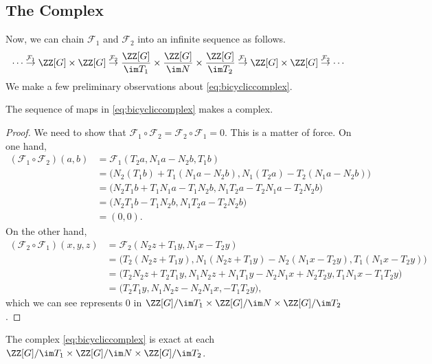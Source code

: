 \documentclass{article}
\begin{document}
\subsection{The Complex}
Now, we can chain $\mathcal F_1$ and $\mathcal F_2$ into an infinite sequence as follows.
\begin{equation}
	\cdots\stackrel{\mathcal F_1}\to\ZZ[G]\times\ZZ[G]\stackrel{\mathcal F_2}\to\frac{\ZZ[G]}{\im T_1}\times\frac{\ZZ[G]}{\im N}\times\frac{\ZZ[G]}{\im T_2}\stackrel{\mathcal F_1}\to\ZZ[G]\times\ZZ[G]\stackrel{\mathcal F_2}\to\cdots \label{eq:bicycliccomplex}
\end{equation}
We make a few preliminary observations about \autoref{eq:bicycliccomplex}.
\begin{lemma} \label{lem:getcomplex}
	The sequence of maps in \autoref{eq:bicycliccomplex} makes a complex.
\end{lemma}
\begin{proof}
	We need to show that $\mathcal F_1\circ\mathcal F_2=\mathcal F_2\circ\mathcal F_1=0$. This is a matter of force. On one hand,
	\begin{align*}
		(\mathcal F_1\circ\mathcal F_2)(a,b) &= \mathcal F_1(T_2a,N_1a-N_2b,T_1b) \\
		&= \big(N_2(T_1b)+T_1(N_1a-N_2b),N_1(T_2a)-T_2(N_1a-N_2b)\big) \\
		&= \big(N_2T_1b+T_1N_1a-T_1N_2b,N_1T_2a-T_2N_1a-T_2N_2b\big) \\
		&= \big(N_2T_1b-T_1N_2b,N_1T_2a-T_2N_2b\big) \\
		&= (0,0).
	\end{align*}
	On the other hand,
	\begin{align*}
		(\mathcal F_2\circ\mathcal F_1)(x,y,z) &= \mathcal F_2(N_2z+T_1y,N_1x-T_2y) \\
		&= \big(T_2(N_2z+T_1y),N_1(N_2z+T_1y)-N_2(N_1x-T_2y),T_1(N_1x-T_2y)\big) \\
		&= \big(T_2N_2z+T_2T_1y,N_1N_2z+N_1T_1y-N_2N_1x+N_2T_2y,T_1N_1x-T_1T_2y\big) \\
		&= \big(T_2T_1y,N_1N_2z-N_2N_1x,-T_1T_2y\big),
	\end{align*}
	which we can see represents $0$ in $\ZZ[G]/\im T_1\times\ZZ[G]/\im N\times\ZZ[G]/\im T_2$.
\end{proof}
\begin{lemma} \label{lem:almostexact}
	The complex \autoref{eq:bicycliccomplex} is exact at each $\ZZ[G]/\im T_1\times\ZZ[G]/\im N\times\ZZ[G]/\im T_2$.
\end{lemma}
\end{document}

